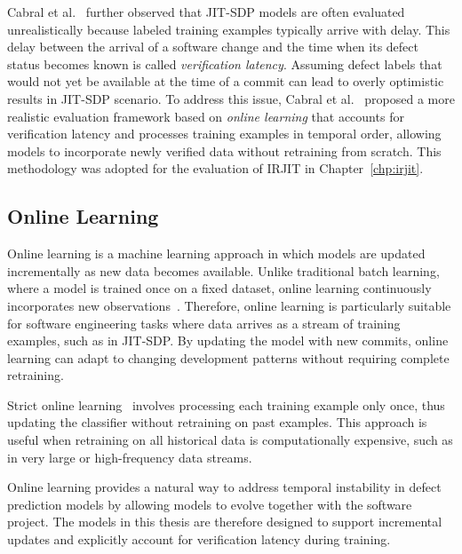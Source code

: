\documentclass[\main/thesis.tex]{subfiles}
\begin{document}
Cabral et al.~\cite{cabral2019class} further observed that JIT-SDP models are often evaluated unrealistically because labeled training examples typically arrive with delay. This delay between the arrival of a software change and the time when its defect status becomes known is called \textit{verification latency}. Assuming defect labels that would not yet be available at the time of a commit can lead to overly optimistic results in JIT-SDP scenario. To address this issue, Cabral et al.~\cite{cabral2019class} proposed a more realistic evaluation framework based on \textit{online learning} that accounts for verification latency and processes training examples in temporal order, allowing models to incorporate newly verified data without retraining from scratch. This methodology was adopted for the evaluation of IRJIT in Chapter~\ref{chp:irjit}.

\subsection{Online Learning} 
Online learning is a machine learning approach in which models are updated incrementally as new data becomes available. Unlike traditional batch learning, where a model is trained once on a fixed dataset, online learning continuously incorporates new observations~\cite{cabral2019class}. Therefore, online learning is particularly suitable for software engineering tasks where data arrives as a stream of training examples, such as in JIT-SDP. By updating the model with new commits, online learning can adapt to changing development patterns without requiring complete retraining.

Strict online learning~\cite{cabral2023investigation} involves processing each training example only once, thus updating the classifier without retraining on past examples. This approach is useful when retraining on all historical data is computationally expensive, such as in very large or high-frequency data streams.

Online learning provides a natural way to address temporal instability in defect prediction models by allowing models to evolve together with the software project. The models in this thesis are therefore designed to support incremental updates and explicitly account for verification latency during training. 
\end{document}
